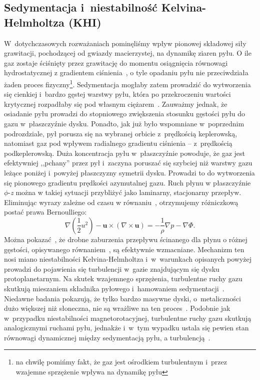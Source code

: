 \subsection{Sedymentacja i~niestabilność Kelvina-Helmholtza (KHI)}
W~dotychczasowych rozważaniach pominęliśmy wpływ pionowej składowej siły
grawitacji, pochodzącej od gwiazdy macierzystej, na dynamikę ziaren pyłu. O ile
gaz zostaje ściśnięty przez grawitację do momentu osiągnięcia równowagi
hydrostatycznej z gradientem ciśnienia~, o tyle opadaniu pyłu nie
przeciwdziała żaden proces fizyczny\footnote{na chwilę pomińmy fakt, że gaz
jest ośrodkiem turbulentnym i~przez wzajemne sprzężenie wpływa na dynamikę
pyłu}. Sedymentacja mogłaby zatem prowadzić do wytworzenia się cienkiej i~bardzo
gęstej warstwy pyłu, która po przekroczeniu wartości krytycznej rozpadłaby się
pod własnym ciężarem~\citep{GW73}. Zauważmy jednak, że osiadanie pyłu prowadzi
do stopniowego zwiększenia stosunku gęstości pyłu do gazu w~płaszczyźnie dysku.
Ponadto, jak już było wspomniane w~poprzednim podrozdziale, pył porusza się na
wybranej orbicie z~prędkością keplerowską, natomiast gaz pod wpływem radialnego
gradientu ciśnienia -- z~prędkością podkeplerowską. Duża koncentracja pyłu
w~płaszczyźnie powoduje, że gaz jest efektywniej ,,pchany'' przez pył i~zaczyna
poruszać się szybciej niż warstwy gazu leżące poniżej i~powyżej płaszczyzny
symetrii dysku. Prowadzi to do wytworzenia się pionowego gradientu prędkości
azymutalnej gazu. Ruch płynu w płaszczyźnie $\phi$-\emph{z} można w takiej sytuacji
przybliżyć jako laminarny, stacjonarny przepływ. Eliminując wyrazy zależne od
czasu w równaniu~, otrzymujemy różniczkową postać prawa
Bernoulliego:
\begin{equation}
   \nabla\left(\frac{1}{2}u^2\right) -
   \mathbf{u}\times\left(\nabla\times\mathbf{u}\right) =
-\frac{1}{\rho}\nabla p - \nabla\Phi.
   \label{eq:bern}
\end{equation}
Można pokazać~\cite{C98}, że drobne zaburzenia przepływu ścinanego dla płynu o
różnej gęstości, opisywanego równaniem~, są efektywnie wzmacniane.
Mechanizm ten nosi miano niestabilności Kelvina-Helmholtza i~w~warunkach
opisanych powyżej prowadzi do pojawienia się turbulencji w~gazie znajdującym się
dysku protoplanetarnym. Na skutek wzajemnego sprzężenia, turbulentne ruchy gazu
skutkują mieszaniem składnika pyłowego i~hamowaniem sedymentacji~\cite{JHK06}.
Niedawne badania pokazują, że tylko bardzo masywne dyski, o~metaliczności dużo
większej niż słoneczna, nie są wrażliwe na ten proces~\citep{L10}. Podobnie jak
w~przypadku niestabilności magnetorotacyjnej, turbulentne ruchy gazu skutkują
analogicznymi ruchami pyłu, jednakże i~w~tym wypadku ustala się pewien stan
równowagi dynamicznej między sedymentacją pyłu, a turbulencją~\cite{JHK06}. 

